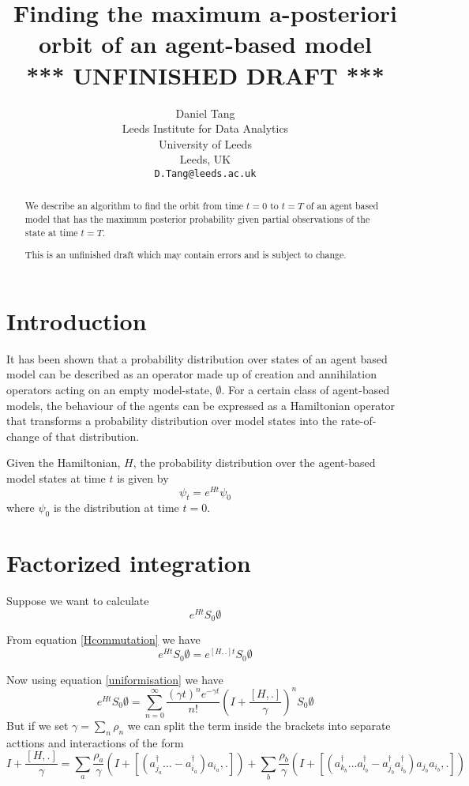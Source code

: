 \documentclass{article}
\title{Finding the maximum a-posteriori orbit of an agent-based model\\
*** UNFINISHED DRAFT ***}
\author{
  Daniel Tang\\
  Leeds Institute for Data Analytics\\
  University of Leeds\\
  Leeds, UK\\
  \texttt{D.Tang@leeds.ac.uk} \\
}
\begin{document}
\maketitle

\begin{abstract}
We describe an algorithm to find the orbit from time $t=0$ to $t=T$ of an agent based model that has the maximum posterior probability given partial observations of the state at time $t=T$.

This is an unfinished draft which may contain errors and is subject to change.
\end{abstract}


\section{Introduction}

It has been shown\cite{tang2019data} that a probability distribution over states of an agent based model can be described as an operator made up of creation and annihilation operators acting on an empty model-state, $\emptyset$. For a certain class of agent-based models, the behaviour of the agents can be expressed as a Hamiltonian operator that transforms a probability distribution over model states into the rate-of-change of that distribution.

Given the Hamiltonian, $H$, the probability distribution over the agent-based model states at time $t$ is given by
\[
\psi_t = e^{Ht}\psi_0
\]
where $\psi_0$ is the distribution at time $t=0$.

\section{Factorized integration}

Suppose we want to calculate
\[
e^{Ht}S_0\emptyset
\]

From equation \ref{Hcommutation} we have
\[
e^{Ht}S_0\emptyset = e^{[H,.]t}S_0\emptyset
\]

Now using equation \ref{uniformisation} we have
\[
e^{Ht}S_0\emptyset = \sum_{n=0}^\infty  \frac{(\gamma t)^n e^{-\gamma t}}{n!}\left(I + \frac{[H,.]}{\gamma}\right)^nS_0\emptyset
\]
But if we set $\gamma = \sum_n \rho_n$ we can split the term inside the brackets into separate acttions and interactions of the form
\[
I + \frac{[H,.]}{\gamma} = 
\sum_a \frac{\rho_a}{\gamma}\left(I + [(a^\dag_{j_a}\ldots - a^\dag_{i_a})a_{i_a},.] \right) + 
\sum_b \frac{\rho_b}{\gamma}\left(I + [(a^\dag_{k_b}\dots a^\dag_{l_b} - a^\dag_{j_b}a^\dag_{i_b})a_{j_b}a_{i_b},.] \right)
\]
\end{document}
